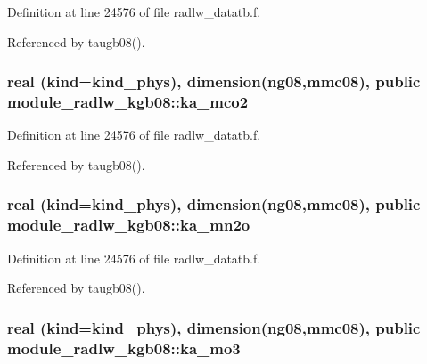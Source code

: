Definition at line 24576 of file radlw\+\_\+datatb.\+f.



Referenced by taugb08().

\subsubsection[{\texorpdfstring{ka\+\_\+mco2}{ka_mco2}}]{\setlength{\rightskip}{0pt plus 5cm}real (kind=kind\+\_\+phys), dimension(ng08,{\bf mmc08}), public module\+\_\+radlw\+\_\+kgb08\+::ka\+\_\+mco2}\hypertarget{namespacemodule__radlw__kgb08_a0fcd13503b3253ec6aab0aa52056f634}{}\label{namespacemodule__radlw__kgb08_a0fcd13503b3253ec6aab0aa52056f634}


Definition at line 24576 of file radlw\+\_\+datatb.\+f.



Referenced by taugb08().

\subsubsection[{\texorpdfstring{ka\+\_\+mn2o}{ka_mn2o}}]{\setlength{\rightskip}{0pt plus 5cm}real (kind=kind\+\_\+phys), dimension(ng08,{\bf mmc08}), public module\+\_\+radlw\+\_\+kgb08\+::ka\+\_\+mn2o}\hypertarget{namespacemodule__radlw__kgb08_a61949dc331e9a58d4f2a31b625481795}{}\label{namespacemodule__radlw__kgb08_a61949dc331e9a58d4f2a31b625481795}


Definition at line 24576 of file radlw\+\_\+datatb.\+f.



Referenced by taugb08().

\subsubsection[{\texorpdfstring{ka\+\_\+mo3}{ka_mo3}}]{\setlength{\rightskip}{0pt plus 5cm}real (kind=kind\+\_\+phys), dimension(ng08,{\bf mmc08}), public module\+\_\+radlw\+\_\+kgb08\+::ka\+\_\+mo3}\hypertarget{namespacemodule__radlw__kgb08_a7dec65e880c278f44419c1ae01490eae}{}\label{namespacemodule__radlw__kgb08_a7dec65e880c278f44419c1ae01490eae}


